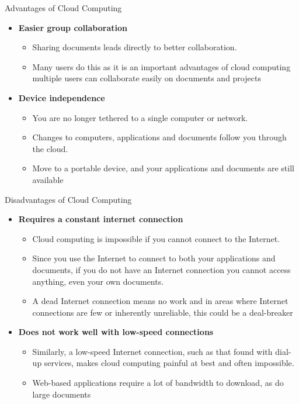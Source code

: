 \documentclass{SKP-beamer}
\begin{document}
\begin{frame}{Advantages of Cloud Computing}
	\begin{itemize}
		
		\item  \textbf{Easier group collaboration}
		\begin{itemize}
			\item  Sharing documents leads directly to better collaboration.
			\item  Many users do this as it is an important advantages of cloud computing
			multiple users can collaborate easily on documents and projects
			
		\end{itemize}
		\item  \textbf{Device independence}
		\begin{itemize}
			\item  You are no longer tethered to a single computer or network.
			\item  Changes to computers, applications and documents follow you through the
			cloud.
			\item  Move to a portable device, and your applications and documents are still 
			available
			
		\end{itemize}
	\end{itemize}
\end{frame}

\begin{frame}{Disadvantages of Cloud Computing}
	\begin{itemize}
		
		\item  \textbf{Requires a constant internet connection}
		\begin{itemize}
			\item  Cloud computing is impossible if you cannot connect to the Internet.
			\item  Since you use the Internet to connect to both your applications and documents, if you do not 
			have an Internet connection you cannot access anything, even your own documents.
			\item  A dead Internet connection means no work and in areas where Internet connections are few or 
			inherently unreliable, this could be a deal-breaker
			
		\end{itemize}
		\item  \textbf{Does not work well with low-speed connections}
		\begin{itemize}
			\item  Similarly, a low-speed Internet connection, such as that found with dial-up services, makes 
			cloud computing painful at best and often impossible.
			\item  Web-based applications require a lot of bandwidth to download, as do large documents
			
		\end{itemize}
	\end{itemize}
\end{frame}
\end{document}
